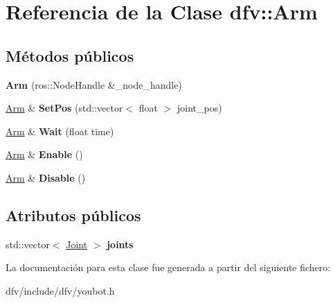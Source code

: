 \hypertarget{classdfv_1_1Arm}{\section{\-Referencia de la \-Clase dfv\-:\-:\-Arm}
\label{classdfv_1_1Arm}
}
\subsection*{\-Métodos públicos}
\begin{DoxyCompactItemize}
\item 
\hypertarget{classdfv_1_1Arm_a5a5267bc903df6071a03a4e2ffff75a7}{{\bfseries \-Arm} (ros\-::\-Node\-Handle \&\-\_\-node\-\_\-handle)}\label{classdfv_1_1Arm_a5a5267bc903df6071a03a4e2ffff75a7}

\item 
\hypertarget{classdfv_1_1Arm_ab40531fe02360ce8012dd747eae37b5d}{\hyperlink{classdfv_1_1Arm}{\-Arm} \& {\bfseries \-Set\-Pos} (std\-::vector$<$ float $>$ joint\-\_\-pos)}\label{classdfv_1_1Arm_ab40531fe02360ce8012dd747eae37b5d}

\item 
\hypertarget{classdfv_1_1Arm_a7c7797e4a6693ebc6c45b9e535a540f3}{\hyperlink{classdfv_1_1Arm}{\-Arm} \& {\bfseries \-Wait} (float time)}\label{classdfv_1_1Arm_a7c7797e4a6693ebc6c45b9e535a540f3}

\item 
\hypertarget{classdfv_1_1Arm_a1120aa8975dcee80300ea38e29ba6252}{\hyperlink{classdfv_1_1Arm}{\-Arm} \& {\bfseries \-Enable} ()}\label{classdfv_1_1Arm_a1120aa8975dcee80300ea38e29ba6252}

\item 
\hypertarget{classdfv_1_1Arm_adf1beb6cd3459531729cf01786a5f102}{\hyperlink{classdfv_1_1Arm}{\-Arm} \& {\bfseries \-Disable} ()}\label{classdfv_1_1Arm_adf1beb6cd3459531729cf01786a5f102}

\end{DoxyCompactItemize}
\subsection*{\-Atributos públicos}
\begin{DoxyCompactItemize}
\item 
\hypertarget{classdfv_1_1Arm_af3e420b054f49cae78287059420e5757}{std\-::vector$<$ \hyperlink{classdfv_1_1Joint}{\-Joint} $>$ {\bfseries joints}}\label{classdfv_1_1Arm_af3e420b054f49cae78287059420e5757}

\end{DoxyCompactItemize}


\-La documentación para esta clase fue generada a partir del siguiente fichero\-:\begin{DoxyCompactItemize}
\item 
dfv/include/dfv/youbot.\-h\end{DoxyCompactItemize}
